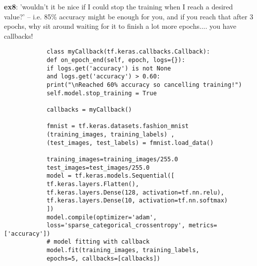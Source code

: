 \documentclass[20pt]{article}
\begin{document}
\begin{itemize}
		\textbf{ex8}: 'wouldn't it be nice if I could stop the training when I reach a desired value?' -- i.e. 85\% accuracy might be enough for you, and if you reach that after 3 epochs, why sit around waiting for it to finish a lot more epochs.... you have callbacks!
		\begin{verbatim}
			class myCallback(tf.keras.callbacks.Callback):
			def on_epoch_end(self, epoch, logs={}):
			if logs.get('accuracy') is not None
			and logs.get('accuracy') > 0.60:
			print("\nReached 60% accuracy so cancelling training!")
			self.model.stop_training = True
			
			callbacks = myCallback()
			
			fmnist = tf.keras.datasets.fashion_mnist
			(training_images, training_labels) , 
			(test_images, test_labels) = fmnist.load_data()
			
			training_images=training_images/255.0
			test_images=test_images/255.0
			model = tf.keras.models.Sequential([
			tf.keras.layers.Flatten(),
			tf.keras.layers.Dense(128, activation=tf.nn.relu),
			tf.keras.layers.Dense(10, activation=tf.nn.softmax)
			])
			model.compile(optimizer='adam',
			loss='sparse_categorical_crossentropy', metrics=['accuracy'])
			# model fitting with callback
			model.fit(training_images, training_labels,
			epochs=5, callbacks=[callbacks])
		\end{verbatim}
	\end{itemize}
\end{document}
